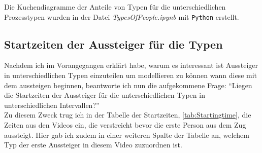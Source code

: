 Die Kuchendiagramme der Anteile von Typen für die unterschiedlichen Prozesstypen wurden in der Datei \textsl{TypesOfPeople.ipynb} mit \texttt{Python} erstellt.

\subsection{Startzeiten der Aussteiger für die Typen} \label{Startzeiten}
Nachdem ich im Vorangegangen erklärt habe, warum es interessant ist Aussteiger in unterschiedlichen Typen einzuteilen um modellieren zu können wann diese mit dem aussteigen beginnen, beantworte ich nun die aufgekommene Frage: "`Liegen die Startzeiten der Aussteiger für die unterschiedlichen Typen in unterschiedlichen Intervallen?"'\\
Zu diesem Zweck trug ich in der Tabelle der Startzeiten, \tablename \ref{tab:Startingtime}, die Zeiten aus den Videos ein, die verstreicht bevor die erste Person aus dem Zug aussteigt. Hier gab ich zudem in einer weiteren Spalte der Tabelle an, welchem Typ der erste Aussteiger in diesem Video zuzuordnen ist. 

